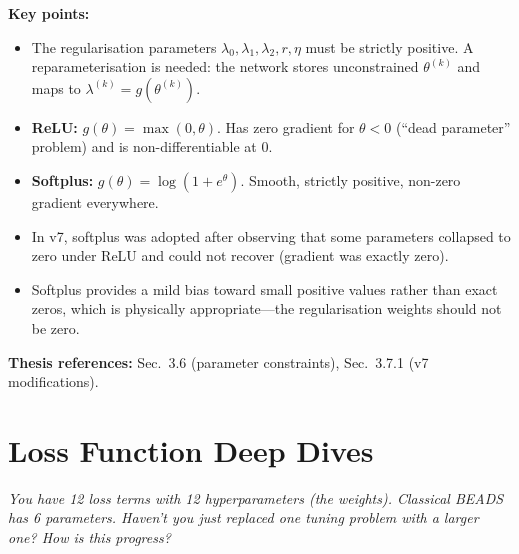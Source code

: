 \documentclass[11pt, letterpaper]{article}
\newcounter{qcounter}
\newcommand{\question}[1]{%
  \stepcounter{qcounter}%
  \begin{questionbox}[Q\theqcounter]%
    \itshape #1%
  \end{questionbox}%
}
\begin{document}
\begin{answerbox}
\textbf{Key points:}
\begin{itemize}[nosep]
  \item The regularisation parameters $\lambda_0, \lambda_1, \lambda_2,
        r, \eta$ must be strictly positive.  A reparameterisation is
        needed: the network stores unconstrained $\theta^{(k)}$ and
        maps to $\lambda^{(k)} = g(\theta^{(k)})$.
  \item \textbf{ReLU:} $g(\theta) = \max(0, \theta)$.  Has zero
        gradient for $\theta < 0$ (``dead parameter'' problem) and
        is non-differentiable at 0.
  \item \textbf{Softplus:} $g(\theta) = \log(1 + e^\theta)$.
        Smooth, strictly positive, non-zero gradient everywhere.
  \item In v7, softplus was adopted after observing that some
        parameters collapsed to zero under ReLU and could not recover
        (gradient was exactly zero).
  \item Softplus provides a mild bias toward small positive values
        rather than exact zeros, which is physically appropriate---the
        regularisation weights should not be zero.
\end{itemize}
\textbf{Thesis references:} Sec.~3.6 (parameter constraints), Sec.~3.7.1 (v7 modifications).
\end{answerbox}


\section{Loss Function Deep Dives}

\question{You have 12 loss terms with 12 hyperparameters (the weights).
Classical BEADS has 6 parameters.  Haven't you just replaced one
tuning problem with a larger one?  How is this progress?}
\end{document}
